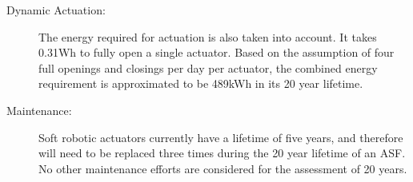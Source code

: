 \begin{description}
\begin{figure}[H]
\begin{center}
\end{center}
\end{figure}


\item[Dynamic Actuation: ] The energy required for actuation is also taken into account. It takes 0.31Wh to fully open a single actuator. Based on the assumption of four full openings and closings per day per actuator, the combined energy requirement is approximated to be 489kWh in its 20 year lifetime. 

\item[Maintenance: ] Soft robotic actuators currently have a lifetime of five years, and therefore will need to be replaced three times during the 20 year lifetime of an ASF. No other maintenance efforts are considered for the assessment of 20 years.


\end{description}
